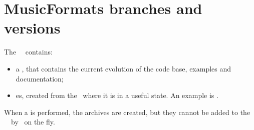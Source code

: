 



\chapter{MusicFormats branches and versions}\label{MusicFormats branches and versions}

The \mf\ \repo\ contains:
\begin{itemize}
\item a \masterBranch, that contains the current evolution of the code base, examples and documentation;
\item {} \branch es, created from the \masterBranch\ where it is in a useful state. An example is .
\end{itemize}

When a  is performed, the  archives are created, but they cannot be added to the \mf\ \repo\ by \github\ on the fly.

